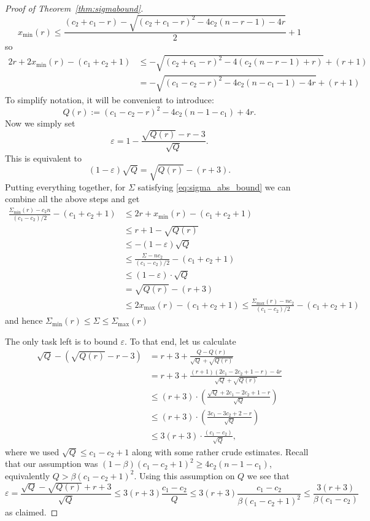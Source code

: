 \documentclass[11pt]{elsarticle}
\theoremstyle{plain}
\theoremstyle{definition}
\newcommand{\ep}{\varepsilon}
\newcommand{\Smax}[1][r]{\Sigma_{\max}(#1)}
\newcommand{\amax}[1][r]{x_{\max}(#1)}
\newcommand{\Smin}[1][r]{\Sigma_{\min}(#1)}
\newcommand{\amin}[1][r]{x_{\min}(#1)}
\begin{document}
\begin{proof}[Proof of Theorem~\ref{thm:sigmabound}]
\[\amin \leq \frac{(c_2+c_1-r)-\sqrt{(c_2+c_1-r)^2-4c_2(n-r-1)-4r}}{2} + 1\] so
\begin{align*}
     2r + 2\amin - (c_1+c_2+1) &\leq -\sqrt{(c_2+c_1-r)^2-4(c_2(n-r-1)+r)} + (r+1)\\
     &= -\sqrt{ (c_1-c_2 -r)^2 - 4c_2(n-c_1-1)-4r} + (r+1)
\end{align*}
To simplify notation, it will be convenient to introduce:
\[ Q(r) := (c_1-c_2-r)^2 - 4c_2(n-1-c_1)+4r.\]
Now we simply set
\begin{equation}\label{eq:epsilon}
\varepsilon = 1 -\frac{\sqrt{Q(r)}-r-3}{\sqrt{Q}}.
\end{equation}
This is equivalent to
\[ (1-\ep)\sqrt{Q} = \sqrt{Q(r)} -(r+3).\]
Putting everything together, for $\Sigma$ satisfying \eqref{eq:sigma_abs_bound} we can combine all the above steps and get
\begin{align*}
\frac{\Smin - c_2 n}{(c_1-c_2)/2} - (c_1+c_2+1)&\leq 2r+\amin -(c_1+c_2+1)\\ &\leq r+1 - \sqrt{Q(r)}\\ &\leq
-(1-\varepsilon)\sqrt{Q}  \\ &\leq\frac{\Sigma - n c_2}{(c_1-c_2)/2}-(c_1+c_2+1) \\ &\leq (1-\varepsilon)\cdot \sqrt{Q} \\ &= \sqrt{Q(r)}-(r+3)\\ &\leq 2\amax - (c_1+c_2+1) \leq \frac{\Smax - n c_2}{(c_1-c_2)/2}-(c_1+c_2+1)
\end{align*}
and hence $\Smin \leq \Sigma \leq \Smax$

The only task left is to bound $\varepsilon$. To that end, let us calculate
\begin{align*}\sqrt{Q}-(\sqrt{Q(r)}-r-3) &=r+3+ \frac{Q-Q(r)}{\sqrt{Q}+\sqrt{Q(r)}}\\
&= r+3+\frac{(r+1)(2c_1-2c_2+1-r)-4r}{\sqrt{Q}+\sqrt{Q(r)}}\\
&\leq (r+3) \cdot \left(\frac{\sqrt{Q}+2c_1-2c_2+1-r}{\sqrt{Q}}\right) \\
&\leq (r+3)\cdot \left(\frac{3c_1 - 3c_2 +2 -r}{\sqrt{Q}}\right)\\
&\leq 3(r+3) \cdot \frac{(c_1-c_2)}{\sqrt{Q}},
\end{align*}
where we used $\sqrt{Q} \leq c_1 - c_2 +1$ along with some rather crude estimates. Recall that our assumption was $(1-\beta)(c_1-c_2+1)^2 \geq 4c_2(n-1-c_1)$, equivalently $Q > \beta (c_1-c_2+1)^2$. Using this assumption on $Q$ we see that
\[ \varepsilon = \frac{\sqrt{Q}-\sqrt{Q(r)}+r+3}{\sqrt{Q}} \leq 3(r+3) \frac{c_1-c_2}{Q} \leq 3(r+3) \frac{c_1-c_2}{\beta (c_1-c_2+1)^2} \leq \frac{3(r+3)}{\beta(c_1-c_2)}\]
as claimed.
\end{proof}
\end{document}
